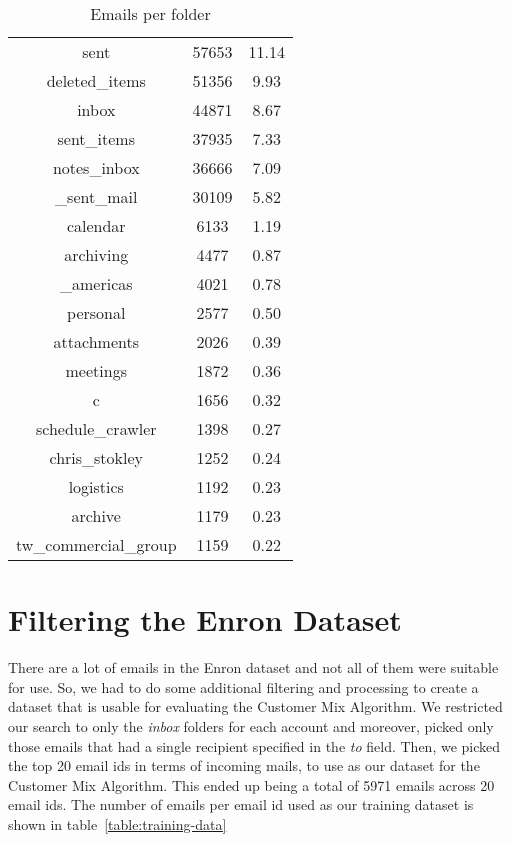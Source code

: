 \documentclass[senior,oneside]{UIUC}
\begin{document}
\begin{table}
{\begin{tabular}{c c c }
sent & 57653 & 11.14 \\
deleted\_items & 51356 & 9.93 \\
inbox & 44871 & 8.67 \\
sent\_items & 37935 & 7.33 \\
notes\_inbox & 36666 & 7.09 \\
\_sent\_mail & 30109 & 5.82 \\
calendar & 6133 & 1.19 \\
archiving & 4477 & 0.87 \\
\_americas & 4021 & 0.78 \\
personal & 2577 & 0.50 \\
attachments & 2026 & 0.39 \\
meetings & 1872 & 0.36 \\
c & 1656 & 0.32 \\
schedule\_crawler & 1398 & 0.27 \\
chris\_stokley & 1252 & 0.24 \\
logistics & 1192 & 0.23 \\
archive & 1179 & 0.23 \\
tw\_commercial\_group & 1159 & 0.22 
\end{tabular}
\caption{Emails per folder}
\label{table:folder}
}
\end{table}

\section{Filtering the Enron Dataset}

There are a lot of emails in the Enron dataset and not all of them were suitable for use. So, we had to do some additional filtering and processing to create a dataset that is usable for evaluating the Customer Mix Algorithm.  We restricted our search to only the \emph{inbox} folders for each account and moreover, picked only those emails that had a single recipient specified in the \emph{to} field. Then, we picked the top 20 email ids in terms of incoming mails, to use as our dataset for the Customer Mix Algorithm. This ended up being a total of 5971 emails across 20 email ids. The number of emails per email id used as our training dataset is shown in table~\ref{table:training-data}
\end{document}
